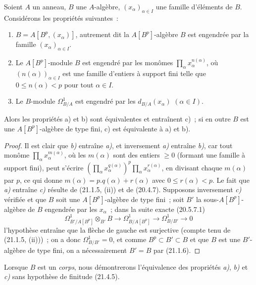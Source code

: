 \begin{proposition}[21.1.7]
\label{0.21.1.7-fr}
Soient $A$ un anneau, $B$ une $A$-algèbre, $(x_\alpha)_{\alpha\in I}$ une
famille d'éléments de $B$. Considérons les propriétés suivantes~:
\begin{enumerate}
  \item[\textup{a)}] $B=A[B^p,(x_\alpha)]$, autrement dit la $A[B^p]$-algèbre
  $B$ est engendrée par la famille $(x_\alpha)_{\alpha\in I}$.
  \item[\textup{b)}] Le $A[B^p]$-module $B$ est engendré par les monômes
  $\prod_\alpha x_\alpha^{n(\alpha)}$, où $(n(\alpha))_{\alpha\in I}$ est
  une famille d'entiers à support fini telle que $0\leq n(\alpha)<p$ pour
  tout $\alpha\in I$.
  \item[\textup{c)}] Le $B$-module $\Omega^1_{B/A}$ est engendré par les
  $d_{B/A}(x_\alpha)$ $(\alpha\in I)$.
\end{enumerate}

Alors les propriétés \textup{a)} et \textup{b)} sont équivalentes et entraînent \textup{c)}~; si en
outre $B$ est une $A[B^p]$-algèbre de type fini, \textup{c)} est équivalente à \textup{a)} et \textup{b)}.
\end{proposition}

\begin{proof}
Il est clair que \emph{b)} entraîne \emph{a)}, et inversement \emph{a)} entraîne \emph{b)}, car tout
monôme $\prod_\alpha x_\alpha^{m(\alpha)}$, où les $m(\alpha)$ sont des
entiers $\geq0$ (formant une famille à support fini), peut s'écrire
$(\prod_\alpha x_\alpha^{q(\alpha)})^p\prod_\alpha x_\alpha^{r(\alpha)}$,
en divisant chaque $m(\alpha)$ par $p$, ce qui donne
$m(\alpha)=p.q(\alpha)+r(\alpha)$ avec $0\leq r(\alpha)<p$.
Le fait que \emph{a)} entraîne \emph{c)} résulte de (21.1.5, (ii)) et de (20.4.7).
Supposons inversement \emph{c)} vérifiée et que $B$ soit une $A[B^p]$-algèbre de
type fini~; soit $B'$ la sous-$A[B^p]$-algèbre de $B$ engendrée par les
$x_\alpha$~; dans la suite exacte (20.5.7.1)
\[
\Omega^1_{B'/A[B^p]}\otimes_{B'}B\longrightarrow
\Omega^1_{B/A[B^p]}\longrightarrow\Omega^1_{B/B'}\longrightarrow0
\]
l'hypothèse entraîne que la flèche de gauche est surjective (compte tenu de
(21.1.5, (ii)))~; on a donc $\Omega^1_{B/B'}=0$, et comme
$B^p\subset B'\subset B$ et que $B$ est une $B'$-algèbre de type fini,
on a nécessairement $B'=B$ par (21.1.6).
\end{proof}

\begin{remark}[21.1.8]
\label{0.21.1.8-fr}
Lorsque $B$ est un \emph{corps}, nous démontrerons l'équivalence des propriétés \emph{a)},
\emph{b)} et \emph{c)} sans hypothèse de finitude (21.4.5).
\end{remark}

